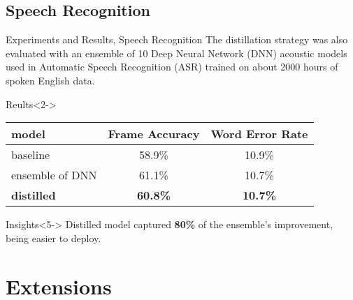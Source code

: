 \documentclass[aspectratio=1610]{beamer}
\begin{document}
    \subsection*{Speech Recognition}
    \begin{frame}{Experiments and Results, Speech Recognition}
        The distillation strategy was also evaluated with an ensemble of 10 Deep Neural Network (DNN) acoustic models used in Automatic Speech Recognition (ASR) trained on about 2000 hours of spoken English data.

        \begin{block}{Reults}<2->
            \begin{table}[H]
                \centering
                \begin{tabular}{lcc}
                    \hline\hline
                    model & Frame Accuracy & Word Error Rate\\
                    \hline
                    baseline & 58.9\% & 10.9\%\\
                    ensemble of DNN & 61.1\% & 10.7\%\\
                    \textbf{distilled} & \textbf{60.8\%} & \textbf{10.7\%}\\
                    \hline\hline
                \end{tabular}
                \label{tab:speech}
            \end{table}
        \end{block}

        \begin{alertblock}{Insights}<5->
            Distilled model captured \textbf{80\%} of the ensemble's improvement, being easier to deploy.
        \end{alertblock}
    \end{frame}


    \section*{Extensions}
\end{document}

